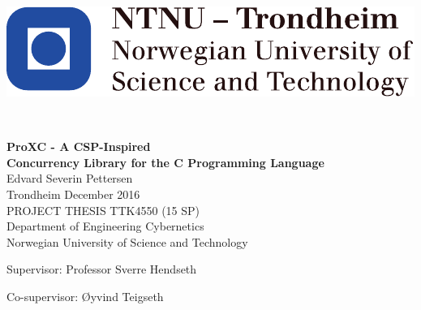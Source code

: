 
\thispagestyle{empty}

\begin{center}
\includegraphics{fig/NTNU}
\end{center}

\mbox{}\\[6pc]
\begin{center}
\Huge\textbf{ProXC - A CSP-Inspired\\ Concurrency Library for the C Programming Language}\\[2pc]

\Large{Edvard Severin Pettersen}\\[1pc]
\large{Trondheim December 2016}\\[2pc]

PROJECT THESIS TTK4550 (15 SP)\\
Department of Engineering Cybernetics\\
Norwegian University of Science and Technology
\end{center}
\vfill

\noindent Supervisor: Professor Sverre Hendseth

\noindent Co-supervisor: Øyvind Teigseth

\afterpage{\blankpage}

